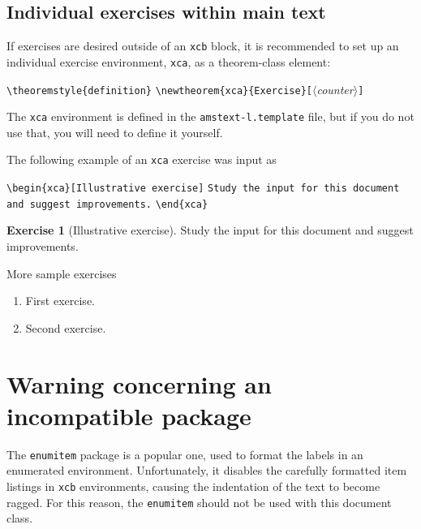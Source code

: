 \documentclass[multixcb]{amstext-l}
\theoremstyle{plain}
\theoremstyle{definition}
\newtheorem{xca}{Exercise}[section]
\newcommand{\pkg}[1]{\texttt{#1}}
\newcommand{\env}[1]{\texttt{#1}}
\def\<#1>{$\langle$\textit{#1}$\rangle$}
\newenvironment{exm}{%
  \par
  \begingroup
    \parindent0pt
    \leftskip2\normalparindent
    \obeylines
}{%
    \par
  \endgroup
}
\begin{document}
\subsection{Individual exercises within main text}

If exercises are desired outside of an \env{xcb} block,
it is recommended to set up an individual exercise environment,
\env{xca}, as a theorem-class element:
\begin{exm}
\verb+\theoremstyle{definition}+
\verb+\newtheorem{xca}{Exercise}[+\<\textit{counter}>\verb+]+
\end{exm}
\noindent
The \env{xca} environment is defined in the \texttt{amstext-l.template}
file, but if you do not use that, you will need to define it yourself.

The following example of an \env{xca} exercise was input as
\begin{exm}
\verb+\begin{xca}[Illustrative exercise]+
\texttt{Study the input for this document and suggest improvements.}
\verb+\end{xca}+
\end{exm}

\begin{xca}[Illustrative exercise]
Study the input for this document and suggest improvements.
\end{xca}

\begin{xcb}{More sample exercises}

\begin{enumerate}
\item First exercise.
\item Second exercise.
\end{enumerate}

\end{xcb}

\section{Warning concerning an incompatible package}

The \pkg{enumitem} package is a popular one, used to format the labels
in an enumerated environment.  Unfortunately, it disables the carefully
formatted item listings in \env{xcb} environments, causing the
indentation of the text to become ragged.  For this reason, the
\pkg{enumitem} should not be used with this document class.


\end{document}
